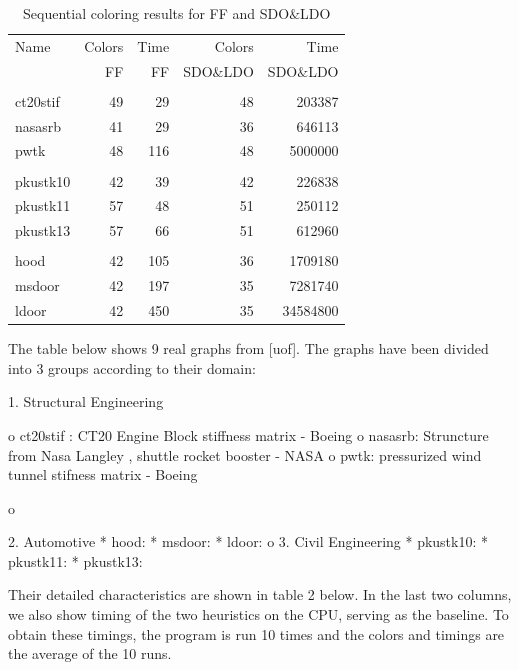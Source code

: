\documentclass[preprint]{sigplanconf}
\begin{document}
\begin{table}
\scriptsize
\begin{center}
\begin{tabular}{l r r r r}
\hline
Name & Colors  & Time  & Colors & Time \\
 & FF & FF &   SDO$\&$LDO &  SDO$\&$LDO\\
\\
\hline
ct20stif & 49 & 29 & 48 & 203387 \\
nasasrb & 41 & 29 & 36 & 646113 \\
pwtk  & 48 & 116 & 48 & 5000000 \\
\\
pkustk10 & 42 & 39 & 42 & 226838 \\
pkustk11 & 57 & 48 & 51 & 250112 \\
pkustk13 & 57 & 66 & 51 & 612960\\
\\
hood & 42 & 105 & 36  & 1709180 \\
msdoor & 42 & 197 & 35 & 7281740 \\
ldoor & 42 & 450 & 35 & 34584800 \\

\end{tabular}
\caption{Sequential coloring results for FF and SDO$\&$LDO}
\label{amean_time}
\end{center}
\end{table}





The table below shows 9 real graphs from [uof]. The graphs have been divided into 3 groups according to their domain:

   1. Structural Engineering

          o ct20stif : CT20 Engine Block stiffness matrix - Boeing
          o nasasrb: Struncture from Nasa Langley , shuttle rocket booster - NASA
          o pwtk: pressurized wind tunnel stifness matrix - Boeing


   

o

   2. Automotive
          * hood:
          * msdoor:
          * ldoor:
    o
         3. Civil Engineering
                * pkustk10:
                * pkustk11:
                * pkustk13:

               

            Their detailed characteristics are shown in table 2 below.  In the last two columns, we also show timing of the two heuristics on the CPU, serving as the baseline.  To obtain these timings, the program is run 10 times and the colors and timings are the average of the 10 runs.
\end{document}
